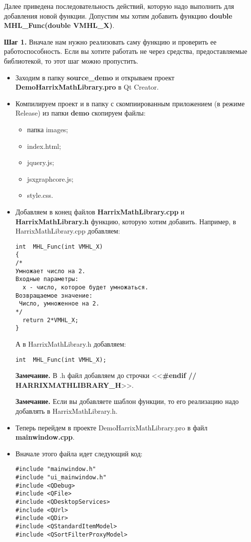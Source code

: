 \documentclass[a4paper,12pt]{article}
\begin{document}
Далее приведена последовательность действий, которую надо выполнить для добавления новой функции. Допустим мы хотим добавить функцию  \textbf{double MHL\_Func(double VMHL\_X)}.

\textbf{Шаг 1.}\label{step1} Вначале нам нужно реализовать саму функцию и проверить ее работоспособность. Если вы хотите работать не через средства, предоставляемые библиотекой, то этот шаг можно пропустить.

\begin{itemize}
\item Заходим в папку \textbf{source\_demo} и открываем проект \textbf{DemoHarrixMathLibrary.pro} в Qt Creator.
\item Компилируем проект и в папку с скомпиированным приложением (в режиме Release) из папки \textbf{demo} скопируем файлы:
\begin{itemize}
\item  папка images;
\item  index.html;
\item  jquery.js;
\item  jsxgraphcore.js;
\item  style.css.
\end {itemize}
\item Добавляем в конец файлов \textbf{HarrixMathLibrary.cpp} и \textbf{HarrixMathLibrary.h} функцию, которую хотим добавить. Например, в HarrixMathLibrary.cpp добавляем:
\begin{lstlisting}[label=examplefunction01, caption=Что добавляем в HarrixMathLibrary.cpp]
int  MHL_Func(int VMHL_X)
{
/*
Умножает число на 2.
Входные параметры:
  x - число, которое будет умножаться.
Возвращаемое значение:
 Число, умноженное на 2.
*/
  return 2*VMHL_X;
}
\end{lstlisting}
А в HarrixMathLibrary.h добавляем:
\begin{lstlisting}[label=examplefunction02, caption=Что добавляем в HarrixMathLibrary.h]
int  MHL_Func(int VMHL_X);
\end{lstlisting}
\textbf{Замечание.} В .h файл добавляем до строчки <<\textbf{\#endif // HARRIXMATHLIBRARY\_H}>>.

\textbf{Замечание.} Если вы добавляете шаблон функции, то его реализацию надо добавлять в HarrixMathLibrary.h.
\item Теперь перейдем в проекте DemoHarrixMathLibrary.pro в файл \textbf{mainwindow.cpp}.
\item Вначале этого файла идет следующий код:
\begin{lstlisting}[label=examplefunction03, caption=mainwindow.cpp]
#include "mainwindow.h"
#include "ui_mainwindow.h"
#include <QDebug>
#include <QFile>
#include <QDesktopServices>
#include <QUrl>
#include <QDir>
#include <QStandardItemModel>
#include <QSortFilterProxyModel>


\end{lstlisting}
\end{itemize}
\end{document}
